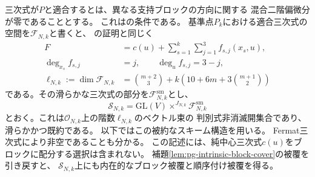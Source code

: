 三次式が$P$と適合するとは、異なる支持ブロックの方向に関する
混合二階偏微分が零であることとする。
これは\cite[HessianによるJacobi条件の線形化]{PoissonCubic}の条件である。
基準点$P_k$における適合三次式の空間を$\mathcal F_{N,k}$と書くと、
\cite[相対Poisson階数層の記述]{PoissonCubic}の証明と同じく
\begin{equation}
 \begin{aligned}
 F&=c(u)+\sum_{s=1}^k\sum_{j=1}^3 f_{s,j}(x_s,u),\\
 \deg_{x_s}f_{s,j}&=j,\qquad\deg_u f_{s,j}=3-j,\\
 \ell_{N,k}:=\dim\mathcal F_{N,k}
   &=\binom{m+2}{3}
     +k\left(10+6m+3\binom{m+1}{2}\right)
 \end{aligned}
 \label{eq:pg-intrinsic-multiblock-cubic-fiber}
\end{equation}
である。その滑らかな三次式の部分を$\mathcal F_{N,k}^{\mathrm{sm}}$とし、
\begin{equation}
 \mathcal S_{N,k}
  =\mathrm{GL}(V)\times^{J_{N,k}}\mathcal F_{N,k}^{\mathrm{sm}}
 \label{eq:pg-intrinsic-multiblock-incidence}
\end{equation}
とおく。これは$\mathcal O_{N,k}$上の階数$\ell_{N,k}$のベクトル束の
判別式非消滅開集合であり、滑らかかつ既約である。
以下ではこの被約なスキーム構造を用いる。
Fermat三次式により非空であることも分かる。
この記述には、純中心三次式$c(u)$をブロックに配分する選択は含まれない。
補題\ref{lem:pg-intrinsic-block-cover}の被覆を引き戻すと、
$\mathcal S_{N,k}$上にも内在的なブロック被覆と順序付け被覆を得る。

